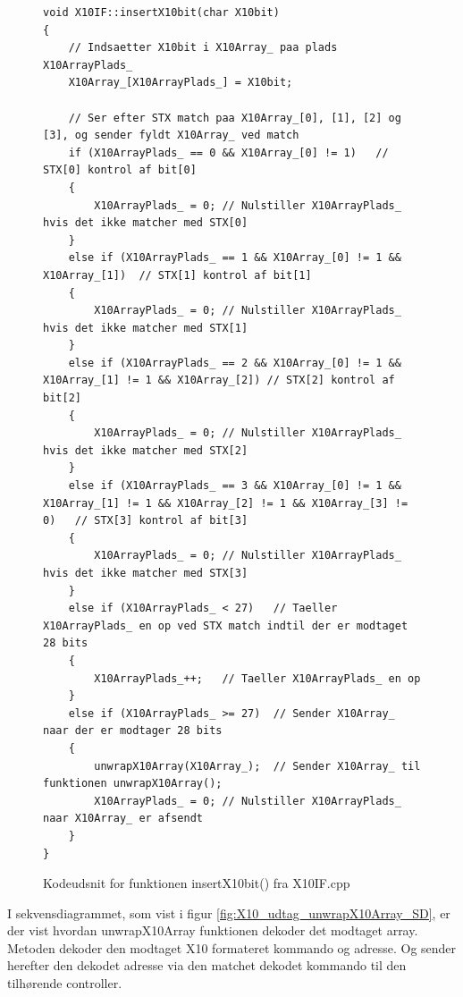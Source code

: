 \begin{figure}[!htb]
\lstset{language=C++}
\begin{lstlisting}
void X10IF::insertX10bit(char X10bit)
{
	// Indsaetter X10bit i X10Array_ paa plads X10ArrayPlads_
	X10Array_[X10ArrayPlads_] = X10bit;
	
	// Ser efter STX match paa X10Array_[0], [1], [2] og [3], og sender fyldt X10Array_ ved match 
	if (X10ArrayPlads_ == 0 && X10Array_[0] != 1)	// STX[0] kontrol af bit[0]
	{
		X10ArrayPlads_ = 0;	// Nulstiller X10ArrayPlads_ hvis det ikke matcher med STX[0]
	}	
	else if (X10ArrayPlads_ == 1 && X10Array_[0] != 1 && X10Array_[1])	// STX[1] kontrol af bit[1]
	{
		X10ArrayPlads_ = 0;	// Nulstiller X10ArrayPlads_ hvis det ikke matcher med STX[1]
	}	
	else if (X10ArrayPlads_ == 2 && X10Array_[0] != 1 && X10Array_[1] != 1 && X10Array_[2])	// STX[2] kontrol af bit[2]
	{
		X10ArrayPlads_ = 0;	// Nulstiller X10ArrayPlads_ hvis det ikke matcher med STX[2]
	}
	else if (X10ArrayPlads_ == 3 && X10Array_[0] != 1 && X10Array_[1] != 1 && X10Array_[2] != 1 && X10Array_[3] != 0)	// STX[3] kontrol af bit[3]
	{
		X10ArrayPlads_ = 0;	// Nulstiller X10ArrayPlads_ hvis det ikke matcher med STX[3]
	}
	else if (X10ArrayPlads_ < 27)	// Taeller X10ArrayPlads_ en op ved STX match indtil der er modtaget 28 bits
	{
		X10ArrayPlads_++;	// Taeller X10ArrayPlads_ en op 
	}	
	else if (X10ArrayPlads_ >= 27)	// Sender X10Array_ naar der er modtager 28 bits
	{
		unwrapX10Array(X10Array_);	// Sender X10Array_ til funktionen unwrapX10Array();
		X10ArrayPlads_ = 0;	// Nulstiller X10ArrayPlads_ naar X10Array_ er afsendt
	}
}
\end{lstlisting}
\caption{Kodeudsnit for funktionen insertX10bit() fra X10IF.cpp}
\label{fig:X10IF_insertX10bit}
\end{figure}

I sekvensdiagrammet, som vist i figur \ref{fig:X10_udtag_unwrapX10Array_SD}, er der vist hvordan unwrapX10Array funktionen dekoder det modtaget array. Metoden dekoder den modtaget X10 formateret kommando og adresse. Og sender herefter den dekodet adresse via den matchet dekodet kommando til den tilhørende controller.

